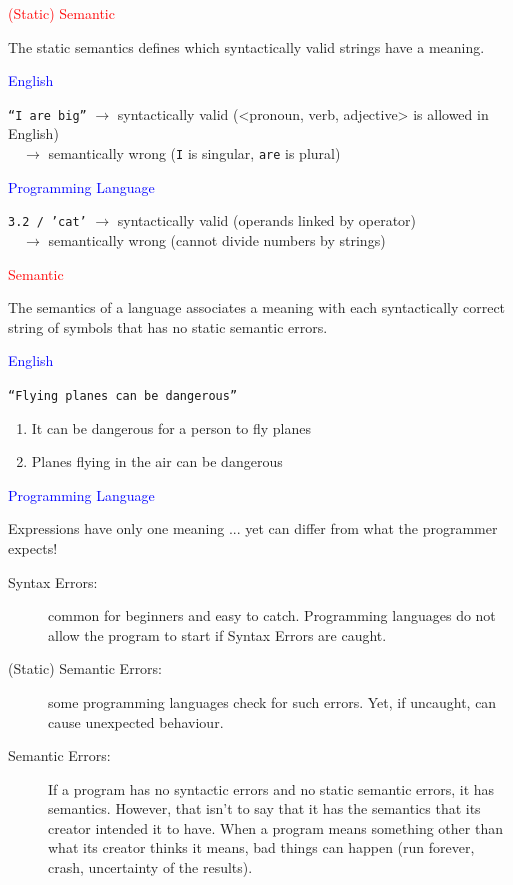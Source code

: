 \documentclass[t,handout,9pt]{beamer}
\begin{document}
%
\begin{frame}
\begin{center}\textcolor{red}{(Static) Semantic}\end{center}
The static semantics defines which syntactically valid strings have a meaning.
\begin{center}\textcolor{blue}{English}\end{center}
\texttt{``I are big''} $\rightarrow$ syntactically valid (<pronoun, verb, adjective> is allowed in English)\\
\qquad\qquad \ \ $\rightarrow$ semantically wrong (\texttt{I} is singular, \texttt{are} is plural)
\begin{center}\textcolor{blue}{Programming Language}\end{center}
\texttt{3.2 / 'cat'} $\rightarrow$ syntactically valid (operands linked by operator)\\
\qquad\qquad \ \ $\rightarrow$ semantically wrong (cannot divide numbers by strings)
\end{frame}
%
\begin{frame}
\begin{center}\textcolor{red}{Semantic}\end{center}
The semantics of a language associates a meaning with each syntactically correct string of symbols that has no static semantic errors.
\begin{center}\textcolor{blue}{English}\end{center}
\texttt{``Flying planes can be dangerous''}\\
\begin{enumerate}
	\item It can be dangerous for a person to fly planes
	\item Planes flying in the air can be dangerous
\end{enumerate}
\begin{center}\textcolor{blue}{Programming Language}\end{center}
Expressions have only one meaning ... yet can differ from what the programmer expects!
\end{frame}
%
\begin{frame}
\vfill
\begin{description}
	\item[Syntax Errors:] common for beginners and easy to catch. Programming languages do not allow the program to start if Syntax Errors are caught.
	\item[(Static) Semantic Errors:] some programming languages check for such errors. Yet, if uncaught, can cause unexpected behaviour.
	\item[Semantic Errors:] If a program has no syntactic errors and no static semantic errors, it has semantics. However, that isn't to say that it has the semantics that its creator intended it to have. When a program means something other than what its creator thinks it means, bad things can happen (run forever, crash, uncertainty of the results).
\end{description}
\vfill
\end{frame}
\end{document}
